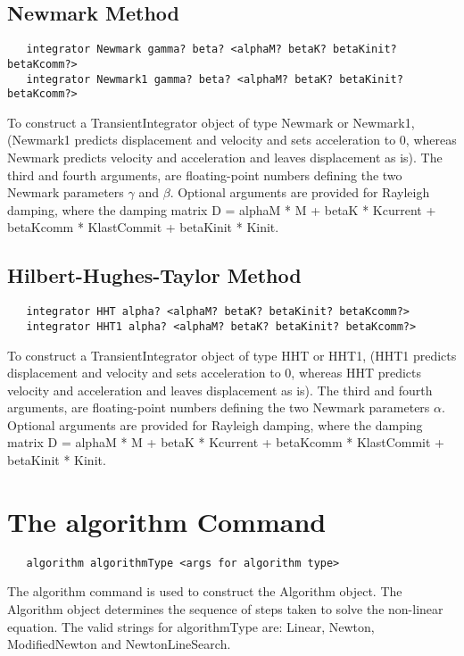\documentclass[12pt]{article}
\begin{document}
\subsection{Newmark Method}

{\sf\small
\begin{verbatim}
   integrator Newmark gamma? beta? <alphaM? betaK? betaKinit? betaKcomm?> 
   integrator Newmark1 gamma? beta? <alphaM? betaK? betaKinit? betaKcomm?> 
\end{verbatim}
}

To construct a TransientIntegrator object of type Newmark or Newmark1,
(Newmark1 predicts displacement and velocity and sets acceleration to
$0$, whereas Newmark predicts velocity and acceleration and leaves
displacement as is). The third and fourth arguments, are
floating-point numbers defining the two Newmark parameters $\gamma$ and
$\beta$. Optional arguments are provided for Rayleigh damping, where
the damping matrix D = alphaM * M + betaK * Kcurrent + betaKcomm *
KlastCommit + betaKinit * Kinit.

\subsection{Hilbert-Hughes-Taylor Method}

{\sf\small
\begin{verbatim}
   integrator HHT alpha? <alphaM? betaK? betaKinit? betaKcomm?> 
   integrator HHT1 alpha? <alphaM? betaK? betaKinit? betaKcomm?> 
\end{verbatim}
}

To construct a TransientIntegrator object of type HHT or HHT1,
(HHT1 predicts displacement and velocity and sets acceleration to
$0$, whereas HHT predicts velocity and acceleration and leaves
displacement as is). The third and fourth arguments, are
floating-point numbers defining the two Newmark parameters
$\alpha$. Optional arguments are provided for Rayleigh damping, where
the damping matrix D = alphaM * M + betaK * Kcurrent + betaKcomm *
KlastCommit + betaKinit * Kinit.

\section {The algorithm Command}
{\sf\small
\begin{verbatim}
   algorithm algorithmType <args for algorithm type>
\end{verbatim}
}

The algorithm command is used to construct the Algorithm
object. The Algorithm object determines the sequence of steps taken
to solve the non-linear equation. The valid strings for algorithmType
are: Linear, Newton, ModifiedNewton and NewtonLineSearch.
\end{document}
